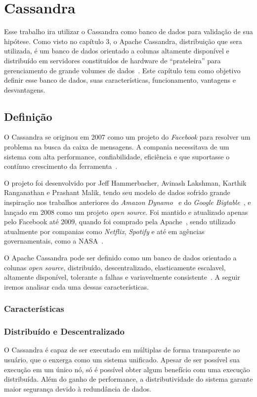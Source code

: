 \chapter{Cassandra}

Esse trabalho ira utilizar o Cassandra como banco de dados para validação de sua hipótese. Como visto no capítulo 3, o Apache Cassandra, distribuição que sera utilizada, é um banco de dados orientado a colunas altamente disponível e distribuído em servidores constituídos de hardware de \enquote{prateleira} para gerenciamento de grande volumes de dados~\cite{lakshmancassandra}. Este capítulo tem como objetivo definir esse banco de dados, suas características, funcionamento, vantagens e desvantagens.

\section{Definição}
O Cassandra se originou em 2007 como um projeto do \emph{Facebook} para resolver um problema na busca da caixa de mensagens. A compania necessitava de um sistema com alta performance, confiabilidade, eficiência e que suportasse o contínuo crescimento da ferramenta~\cite{lakshmancassandra, cassandraguide}. 

O projeto foi desenvolvido por Jeff Hammerbacher, Avinash Lakshman, Karthik Ranganathan e Prashant Malik, tendo seu modelo de dados sofrido grande inspiração nos trabalhos anteriores do \emph{Amazon Dynamo}~\cite{dynamo} e do \emph{Google Bigtable}~\cite{bigtable}, e lançado em 2008 como um projeto \emph{open source}. Foi mantido e atualizado apenas pelo Facebook até 2009, quando foi comprado pela Apache~\cite{cassandraguide}, sendo utilizado atualmente por companias como \emph{Netflix}, \emph{Spotify} e até em agências governamentais, como a NASA~\cite{cassandracompanies}. 

O Apache Cassandra pode ser definido como um banco de dados orientado a colunas \emph{open source}, distribuído, descentralizado, elasticamente escalavel, altamente disponível, tolerante a falhas e variavelmente consistente~\cite{cassandraguide}. A seguir iremos analisar cada uma dessas características.

\subsection{Características}

\subsection*{Distribuído e Descentralizado}
O Cassandra é capaz de ser executado em múltiplas de forma transparente ao usuário, que o enxerga como um sistema unificado. Apesar de ser possível sua execução em um único nó, só é possível obter algum benefício com uma execução distribuída. Além do ganho de performance, a distributividade do sistema garante maior segurança devido à redundância de dados.

